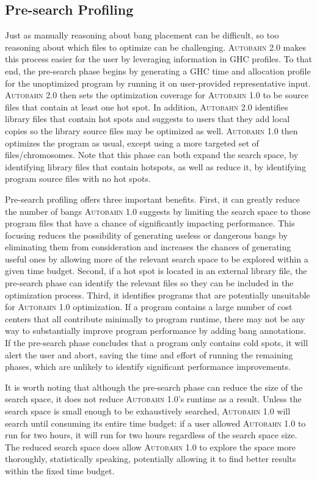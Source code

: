 \documentclass[format=sigplan, review=true, 9pt]{acmart}
\newcommand{\hotspot}[0]{hot spot}
\newcommand{\hotspots}[0]{hot spots}
\newcommand{\coldspots}[0]{cold spots}
\newcommand{\dangerous}[0]{dangerous}
\newcommand{\useful}[0]{useful}
\newcommand{\useless}[0]{useless}
\newcommand{\Ao}[0]{\textsc{Autobahn 1.0}}
\newcommand{\At}[0]{\textsc{Autobahn 2.0}}
\newcommand{\preopt}[0]{pre-search}
\newcommand{\Preopt}[0]{Pre-search}
\begin{document}
\subsection{\Preopt{} Profiling}

Just as manually reasoning about bang placement can be difficult, 
so too reasoning about which files to optimize can be challenging.
\At{} makes this process easier for the user by leveraging information
in GHC profiles.  
To that end, the \preopt{} phase begins by generating a GHC time
and allocation profile for the unoptimized program by running it on 
user-provided representative input.
\At{} then sets the optimization coverage
for \Ao{} to be source files that contain at least one \hotspot{}. 
In addition, 
\At{} identifies library files that contain \hotspots{} and
suggests to users that they add local copies so the library source
files may be optimized as well. 
\Ao{} then optimizes the program as usual, except using a more
targeted set of files/chromosomes.
Note that this phase can both expand the search space, by identifying
library files that contain hotspots, as well as reduce it, by
identifying program source files with no \hotspots{}. 

\Preopt{} profiling offers three important benefits.
First, it can greatly reduce the number of bangs \Ao{} suggests by
limiting the search space to those program files that have a chance of
significantly impacting performance. This focusing reduces the
possibility of generating \useless{} or \dangerous{} bangs by
eliminating them from consideration
and
increases the chances of generating \useful{} ones by allowing more of
the relevant search space to be explored within a given time budget.
Second, if a \hotspot{} is located in an external library file,
the \preopt{} phase can identify the relevant files so they can be
included in the optimization process. 
Third, it identifies programs that are potentially unsuitable for
\Ao{} optimization. If a program contains a large number of cost
centers that all contribute minimally to program runtime, there may
not be any way to substantially improve program performance by adding
bang annotations. If the \preopt{} phase concludes that
a program only contains \coldspots{}, it will alert the user and
abort, saving the time and effort of running the remaining phases, 
which are unlikely to identify significant performance improvements.


It is worth noting that although the \preopt{} phase can reduce the
size of the search space, it does not reduce \Ao{}'s runtime as a
result. Unless the search space is small enough to be exhaustively
searched, \Ao{} will search until consuming its entire time budget:
if a user allowed \Ao{} to run for two hours, it
will run for two hours regardless of the search space
size. The reduced search space does allow \Ao{} to explore the space
more thoroughly, statistically speaking, potentially allowing it to 
find better results within the fixed time budget.
\end{document}
